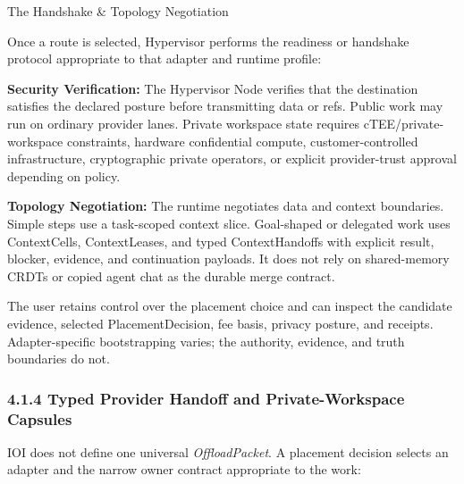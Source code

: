 \documentclass[
  11pt,
]{article}
\begin{document}
The Handshake \& Topology Negotiation

Once a route is selected, Hypervisor performs the readiness or handshake
protocol appropriate to that adapter and runtime profile:

\textbf{Security Verification:} The Hypervisor Node verifies that the
destination satisfies the declared posture before transmitting data or
refs. Public work may run on ordinary provider lanes. Private workspace
state requires cTEE/private-workspace constraints, hardware confidential
compute, customer-controlled infrastructure, cryptographic private
operators, or explicit provider-trust approval depending on policy.

\textbf{Topology Negotiation:} The runtime negotiates data and context
boundaries. Simple steps use a task-scoped context slice. Goal-shaped or
delegated work uses ContextCells, ContextLeases, and typed ContextHandoffs
with explicit result, blocker, evidence, and continuation payloads. It does
not rely on shared-memory CRDTs or copied agent chat as the durable merge
contract.

The user retains control over the placement choice and can inspect the
candidate evidence, selected PlacementDecision, fee basis, privacy posture,
and receipts. Adapter-specific bootstrapping varies; the authority, evidence,
and truth boundaries do not.

\hypertarget{typed-provider-handoff-and-private-workspace-capsules}{%
\subsubsection{4.1.4 Typed Provider Handoff and Private-Workspace
Capsules}\label{typed-provider-handoff-and-private-workspace-capsules}}

IOI does not define one universal \emph{OffloadPacket}. A placement decision
selects an adapter and the narrow owner contract appropriate to the work:
\end{document}
